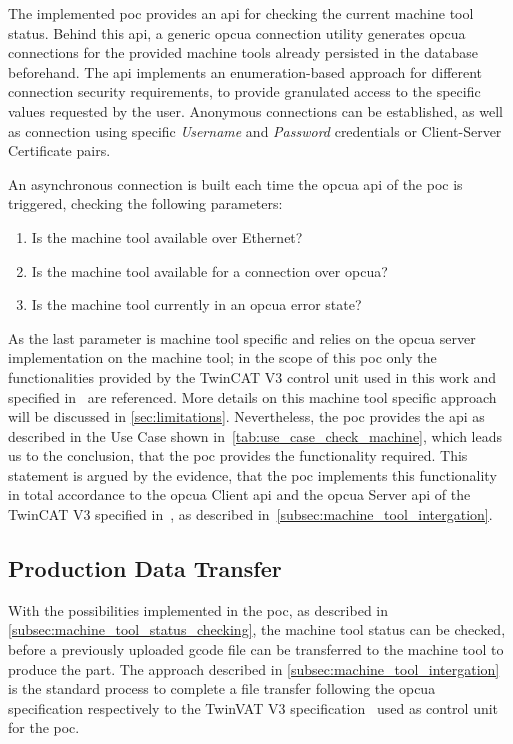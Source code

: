 \documentclass[
a4paper,
twoside,
headsepline,
cleardoublepage=empty,
parskip=half,
draft=false
]{scrbook}
\begin{document}
				The implemented \gls{poc} provides an \gls{api} for checking the current machine tool status. Behind this \gls{api}, a generic \gls{opcua} connection utility generates \gls{opcua} connections for the provided machine tools already persisted in the database beforehand. The \gls{api} implements an enumeration-based approach for different connection security requirements, to provide granulated access to the specific values requested by the user. Anonymous connections can be established, as well as connection using specific \textit{Username} and \textit{Password} credentials or Client-Server Certificate pairs.

				An asynchronous connection is built each time the \gls{opcua} \gls{api} of the \gls{poc} is triggered, checking the following parameters:

				\begin{enumerate}
					\item Is the machine tool available over Ethernet?
					\item Is the machine tool available for a connection over \gls{opcua}?
					\item Is the machine tool currently in an \gls{opcua} error state?
				\end{enumerate}

				As the last parameter is machine tool specific and relies on the \gls{opcua} server implementation on the machine tool; in the scope of this \gls{poc} only the functionalities provided by the TwinCAT V3 control unit used in this work and specified in~\cite{twincat2018} are referenced. More details on this machine tool specific approach will be discussed in \cref{sec:limitations}. Nevertheless, the \gls{poc} provides the \gls{api} as described in the Use Case shown in~\cref{tab:use_case_check_machine}, which leads us to the conclusion, that the \gls{poc} provides the functionality required. This statement is argued by the evidence, that the \gls{poc} implements this functionality in total accordance to the \gls{opcua} Client \gls{api} and the \gls{opcua} Server \gls{api} of the TwinCAT V3 specified in~\cite{twincat2018}, as described in~\cref{subsec:machine_tool_intergation}.

			\subsection{Production Data Transfer}\label{subsec:g_code_transfer}

				With the possibilities implemented in the \gls{poc}, as described in \cref{subsec:machine_tool_status_checking}, the machine tool status can be checked, before a previously uploaded \gls{gcode} file can be transferred to the machine tool to produce the part. The approach described in \cref{subsec:machine_tool_intergation} is the standard process to complete a file transfer following the \gls{opcua} specification respectively to the TwinVAT V3 specification~\cite{twincat2018} used as control unit for the \gls{poc}.
\end{document}
